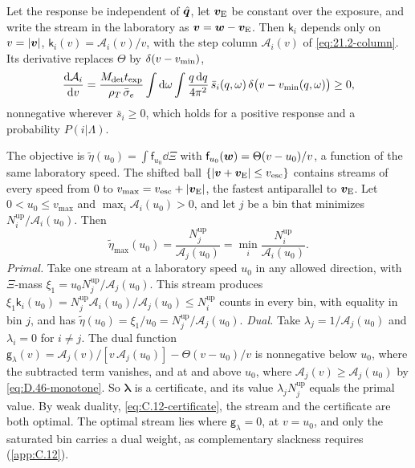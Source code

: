 Let the response be independent of $\hat{\bm{q}}$, let $\bm{v}_{\mathrm{E}}$ be constant over the exposure, and write the stream in the laboratory as $\bm{v} = \bm{w} - \bm{v}_{\mathrm{E}}$. Then $\mathsf{k}_i$ depends only on $v = |\bm{v}|$, $\mathsf{k}_i(v) = \mathcal{A}_i(v)/v$, with the step column $\mathcal{A}_i(v)$ of \cref{eq:21.2-column}. Its derivative replaces $\Theta$ by $\delta(v - v_{\mathrm{min}})$,
\begin{equation}
  \frac{\mathrm{d}\mathcal{A}_i}{\mathrm{d} v} = \frac{M_{\mathrm{det}}t_{\mathrm{exp}}}{\rho_T\,\bar{\sigma}_{e}}\int\mathrm{d}\omega\int\frac{q\,\mathrm{d} q}{4\pi^2}\,\bar s_i(q,\omega)\,\delta\bigl(v - v_{\mathrm{min}}(q,\omega)\bigr) \ge 0 ,
  \label{eq:D.46-monotone}
\end{equation}
nonnegative wherever $\bar s_i \ge 0$, which holds for a positive response and a probability $P(i|\Lambda)$.

The objective is $\tilde\eta(u_0) = \int\mathsf{f}_{u_0}\dd\Xi$ with $\mathsf{f}_{u_0}(\bm{w}) = \Theta(v - u_0)/v$, a function of the same laboratory speed. The shifted ball $\{|\bm{v} + \bm{v}_{\mathrm{E}}| \le v_{\mathrm{esc}}\}$ contains streams of every speed from 0 to $v_{\mathrm{max}} = v_{\mathrm{esc}} + |\bm{v}_{\mathrm{E}}|$, the fastest antiparallel to $\bm{v}_{\mathrm{E}}$. Let $0 < u_0 \le v_{\mathrm{max}}$ and $\max_i\mathcal{A}_i(u_0) > 0$, and let $j$ be a bin that minimizes $N_i^{\mathrm{up}}/\mathcal{A}_i(u_0)$. Then
\begin{equation}
  \tilde\eta_{\max}(u_0) = \frac{N_j^{\mathrm{up}}}{\mathcal{A}_j(u_0)} = \min_i\frac{N_i^{\mathrm{up}}}{\mathcal{A}_i(u_0)} .
  \label{eq:D.46-hib}
\end{equation}
\emph{Primal.} Take one stream at a laboratory speed $u_0$ in any allowed direction, with $\Xi$-mass $\xi_1 = u_0N_j^{\mathrm{up}}/\mathcal{A}_j(u_0)$. This stream produces $\xi_1\mathsf{k}_i(u_0) = N_j^{\mathrm{up}}\mathcal{A}_i(u_0)/\mathcal{A}_j(u_0) \le N_i^{\mathrm{up}}$ counts in every bin, with equality in bin $j$, and has $\tilde\eta(u_0) = \xi_1/u_0 = N_j^{\mathrm{up}}/\mathcal{A}_j(u_0)$. \emph{Dual.} Take $\lambda_j = 1/\mathcal{A}_j(u_0)$ and $\lambda_i = 0$ for $i \ne j$. The dual function $\mathsf{g}_\lambda(v) = \mathcal{A}_j(v)/[v\,\mathcal{A}_j(u_0)] - \Theta(v - u_0)/v$ is nonnegative below $u_0$, where the subtracted term vanishes, and at and above $u_0$, where $\mathcal{A}_j(v) \ge \mathcal{A}_j(u_0)$ by \cref{eq:D.46-monotone}. So $\boldsymbol\lambda$ is a certificate, and its value $\lambda_jN_j^{\mathrm{up}}$ equals the primal value. By weak duality, \cref{eq:C.12-certificate}, the stream and the certificate are both optimal. The optimal stream lies where $\mathsf{g}_\lambda = 0$, at $v = u_0$, and only the saturated bin carries a dual weight, as complementary slackness requires (\cref{app:C.12}).

